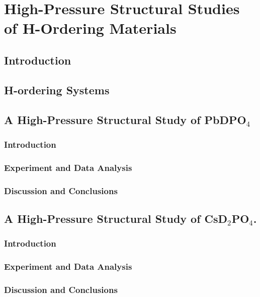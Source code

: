 \chapter{High-Pressure Structural Studies of H-Ordering Materials}

\section{Introduction}

\section{H-ordering Systems}

\section{A High-Pressure Structural Study of PbDPO$_4$}

\subsection{Introduction}

\subsection{Experiment and Data Analysis}

\subsection{Discussion and Conclusions}

\section{A High-Pressure Structural Study of CsD$_2$PO$_4$.}

\subsection{Introduction}

\subsection{Experiment and Data Analysis}

\subsection{Discussion and Conclusions}

